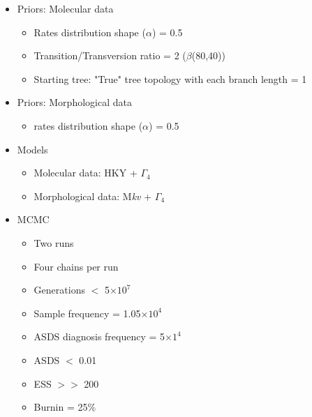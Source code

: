 \documentclass[12pt,letterpaper]{article}
\begin{document}
\begin{itemize}
  \item Priors: Molecular data
  \begin{itemize}
    \item Rates distribution shape ($\alpha$) = 0.5
    \item Transition/Transversion ratio = 2 ($\beta$(80,40))
    \item Starting tree: "True" tree topology with each branch length = 1
  \end{itemize}
  \item Priors: Morphological data
  \begin{itemize}
    \item rates distribution shape ($\alpha$) = 0.5
  \end{itemize}
  \item Models
  \begin{itemize}
    \item Molecular data: HKY + $\Gamma_4$
    \item Morphological data: M\textit{kv} + $\Gamma_4$
  \end{itemize}
  \item MCMC
  \begin{itemize}
    \item Two runs
    \item Four chains per run
    \item Generations $<$ 5$\times$$10^7$
    \item Sample frequency = 1.05$\times$$10^4$
    \item ASDS diagnosis frequency = 5$\times$$1^4$
    \item ASDS $<$ 0.01
    \item ESS $>>$ 200
    \item Burnin = 25\%
  \end{itemize}
\end{itemize}




\end{document}
